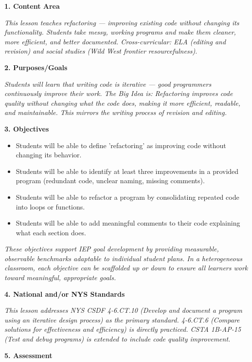 \documentclass[11pt,letterpaper]{article}
\begin{document}
\textbf{1. Content Area}

\textit{This lesson teaches refactoring --- improving existing code without changing its functionality. Students take messy, working programs and make them cleaner, more efficient, and better documented. Cross-curricular: ELA (editing and revision) and social studies (Wild West frontier resourcefulness).}

\textbf{2. Purposes/Goals}

\textit{Students will learn that writing code is iterative --- good programmers continuously improve their work. The Big Idea is: Refactoring improves code quality without changing what the code does, making it more efficient, readable, and maintainable. This mirrors the writing process of revision and editing.}

\textbf{3. Objectives}

\begin{itemize}
  \item Students will be able to define 'refactoring' as improving code without changing its behavior.

  \item Students will be able to identify at least three improvements in a provided program (redundant code, unclear naming, missing comments).

  \item Students will be able to refactor a program by consolidating repeated code into loops or functions.

  \item Students will be able to add meaningful comments to their code explaining what each section does.
\end{itemize}

\textit{These objectives support IEP goal development by providing measurable, observable benchmarks adaptable to individual student plans. In a heterogeneous classroom, each objective can be scaffolded up or down to ensure all learners work toward meaningful, appropriate goals.}

\textbf{4. National and/or NYS Standards}

\textit{This lesson addresses NYS CSDF 4-6.CT.10 (Develop and document a program using an iterative design process) as the primary standard. 4-6.CT.6 (Compare solutions for effectiveness and efficiency) is directly practiced. CSTA 1B-AP-15 (Test and debug programs) is extended to include code quality improvement.}

\newpage
\textbf{5. Assessment}
\end{document}
